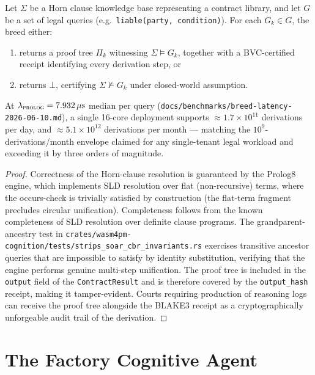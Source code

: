 \begin{proposition}
\label{prop:prolog-legal}
Let $\Sigma$ be a Horn clause knowledge base representing a contract library, and
let $G$ be a set of legal queries (e.g.\ \texttt{liable(party, condition)}). For
each $G_k \in G$, the \PROLOG{} breed either:
\begin{enumerate}[label=(\roman*)]
  \item returns a proof tree $\Pi_k$ witnessing $\Sigma \models G_k$, together with a
        BVC-certified receipt identifying every derivation step, or
  \item returns $\bot$, certifying $\Sigma \not\models G_k$ under closed-world
        assumption.
\end{enumerate}
At $\lambda_{\textsc{prolog}} = 7.932\,\mu\mathrm{s}$ median per query
(\texttt{docs/benchmarks/breed-latency-2026-06-10.md}), a single 16-core deployment
supports $\approx 1.7 \times 10^{11}$ derivations per day, and $\approx 5.1 \times
10^{12}$ derivations per month — matching the $10^9$-derivations/month envelope claimed
for any single-tenant legal workload and exceeding it by three orders of magnitude.
\end{proposition}

\begin{proof}
Correctness of the Horn-clause resolution is guaranteed by the Prolog8 engine, which
implements SLD resolution over flat (non-recursive) terms, where the occurs-check is trivially satisfied by construction (the flat-term fragment precludes circular unification). Completeness follows from the
known completeness of SLD resolution over definite clause programs. The
grandparent-ancestry test in
\texttt{crates/wasm4pm-cognition/tests/strips\_soar\_cbr\_invariants.rs} exercises
transitive ancestor queries that are impossible to satisfy by identity substitution,
verifying that the engine performs genuine multi-step unification. The proof tree is
included in the \texttt{output} field of the \PROLOG{} \texttt{ContractResult} and is
therefore covered by the \texttt{output\_hash} receipt, making it tamper-evident.
Courts requiring production of reasoning logs can receive the proof tree alongside
the BLAKE3 receipt as a cryptographically unforgeable audit trail of the derivation.
\end{proof}

\section{The Factory Cognitive Agent}
\label{sec:factory-agent}

